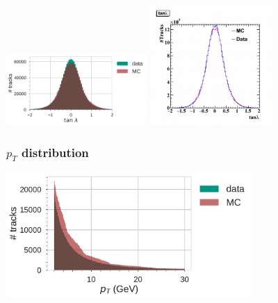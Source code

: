 \documentclass[18pt]{beamer}
\begin{document}
\begin{frame}[allowframebreaks]
  \includegraphics[width=0.4\textwidth]{figures/gcr_august_2017_tan_lambda_distribution_normed=False.pdf}
  \includegraphics[width=0.35\textwidth]{figures/b2gm_tanlambda.png}\\
\end{frame}

\begin{frame}
  \frametitle{$p_T$ distribution}
  \includegraphics[width=0.7\textwidth]{figures/gcr_august_2017_pt_distribution_normed=False.pdf}
\end{frame}
      
\end{document}
